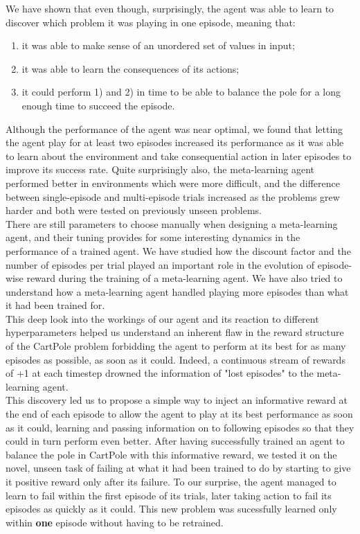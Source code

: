 We have shown that even though, surprisingly, the agent was able to learn
to discover which problem it was playing in one episode, meaning that:
\begin{enumerate}
	\item it was able to make sense of an unordered set of values in input;
	\item it was able to learn the consequences of its actions;
	\item it could perform 1) and 2) in time to be able to balance the
		pole for a long enough time to succeed the episode.
\end{enumerate}
Although the performance of the agent was near optimal, we found that letting
the agent play for at least two episodes increased its performance as it
was able to learn about the environment and take consequential action in
later episodes to improve its success rate. Quite surprisingly also,
the meta-learning agent performed better in environments which were more
difficult, and the difference between single-episode and multi-episode trials
increased as the problems grew harder and both were tested on previously unseen
problems.\\

There are still parameters to choose manually when designing a meta-learning
agent, and their tuning provides for some interesting dynamics in the 
performance of a trained agent. We have studied how the discount factor
and the number of episodes per trial
played an important role in the evolution of episode-wise reward during the 
training of a meta-learning agent.
We have also tried to understand how a meta-learning agent handled playing
more episodes than what it had been trained for.\\

This deep look into the workings of our agent and its reaction to different
hyperparameters helped us understand an inherent flaw in the reward structure
of the CartPole problem forbidding the agent to perform at its best for
as many episodes as possible, as soon as it could. Indeed, a continuous
stream of rewards of +1 at each timestep drowned the information of "lost
episodes" to the meta-learning agent.\\

This discovery led us to propose a simple way to inject an informative reward
at the end of each episode to allow the agent to play at its best performance
as soon as it could, learning and passing information on to following episodes
so that they could in turn perform even better. After having successfully
trained an agent to balance the pole in CartPole with this informative reward,
we tested it on the novel, unseen task of failing at what it had been trained
to do by starting to give it positive reward only after its failure. To
our surprise, the agent managed to learn to fail within the first episode
of its trials, later taking action to fail its episodes as quickly as it 
could. This new problem was sucessfully learned only within \textbf{one} episode
without having to be retrained.\\

